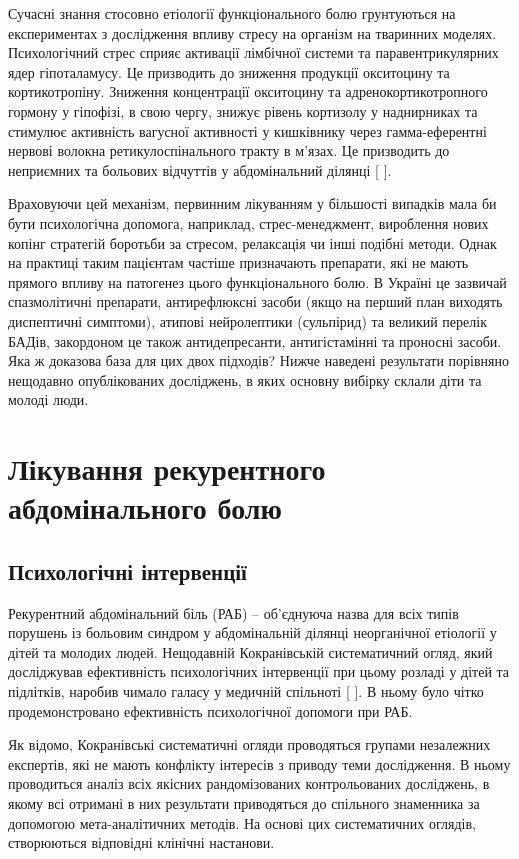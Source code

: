 \par 
Сучасні знання стосовно етіології функціонального болю грунтуються на експериментах з дослідження впливу стресу на організм на тваринних моделях. Психологічний стрес сприяє активації лімбічної системи та паравентрикулярних ядер гіпоталамусу. Це призводить до зниження продукції окситоцину та кортикотропіну. Зниження концентрації окситоцину та адренокортикотропного гормону у гіпофізі, в свою чергу, знижує рівень кортизолу у наднирниках та стимулює активність вагусної активності у кишківнику через гамма-еферентні нервові волокна ретикулоспінального тракту в м’язах. Це призводить до неприємних та больових відчуттів у абдомінальний ділянці [
\cite{7}]. 
\par 
Враховуючи цей механізм, первинним лікуванням у більшості випадків мала би бути психологічна допомога, наприклад, стрес-менеджмент, вироблення нових копінг стратегій боротьби за стресом, релаксація чи інші подібні методи. Однак на практиці таким пацієнтам частіше призначають препарати, які не мають прямого впливу на патогенез цього функціонального болю. В Україні це зазвичай спазмолітичні препарати, антирефлюксні засоби (якщо на перший план виходять диспептичні симптоми), атипові нейролептики (сульпірид) та великий перелік БАДів, закордоном це також антидепресанти, антигістамінні та проносні засоби. Яка ж доказова база для цих двох підходів? Нижче наведені результати порівняно нещодавно опублікованих досліджень, в яких основну вибірку склали діти та молоді люди.
\par 
\section {Лікування рекурентного абдомінального болю}
\subsection {Психологічні інтервенції}
Рекурентний абдомінальний біль (РАБ) – об’єднуюча назва для всіх типів порушень із больовим синдром у абдомінальній ділянці неорганічної етіології у дітей та молодих людей. Нещодавній Кокранівській систематичний огляд, який досліджував ефективність психологічних інтервенції при цьому розладі у дітей та підлітків, наробив чимало галасу у медичній спільноті [
]. В ньому було чітко продемонстровано ефективність психологічної допомоги при РАБ.

Як відомо, Кокранівські систематичні огляди проводяться групами незалежних експертів, які не мають конфлікту інтересів з приводу теми дослідження. В ньому проводиться аналіз всіх якісних рандомізованих контрольованих досліджень, в якому всі отримані в них результати приводяться до спільного знаменника за допомогою мета-аналітичних методів. На основі цих систематичних оглядів, створюються відповідні клінічні настанови. 

